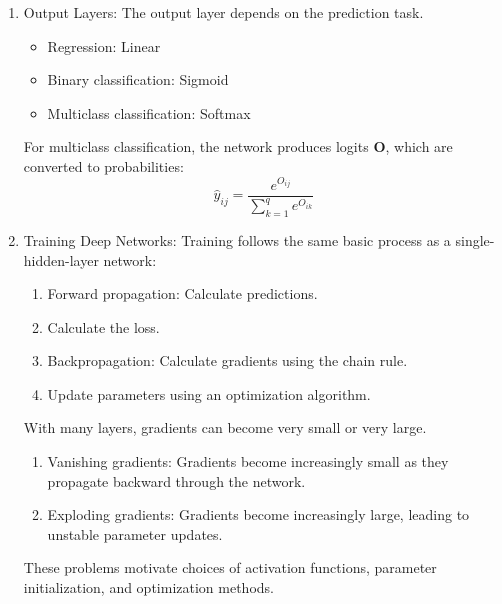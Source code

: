 \documentclass{article}
\begin{document}
\begin{enumerate}
\begin{itemize}
\item Common activation functions:

ReLU
\[
\sigma(x)=\max(0,x)
\]

Sigmoid
\[
\sigma(x)=\frac{1}{1+e^{-x}}
\]

Tanh
\[
\sigma(x)=\frac{e^x-e^{-x}}{e^x+e^{-x}}
\]
ReLU is commonly used in hidden layers. Sigmoid is commonly used for binary classification outputs.

\item For multiple hidden layers:
\[
\begin{aligned}
\mathbf{H}^{(1)} &=
\sigma_1(\mathbf{X}\mathbf{W}^{(1)}
+\mathbf{b}^{(1)})\\
\mathbf{H}^{(2)} &=
\sigma_2(\mathbf{H}^{(1)}\mathbf{W}^{(2)}
+\mathbf{b}^{(2)})
\end{aligned}
\]
Continue stacking layers as needed.
\end{itemize}

\item Output Layers: The output layer depends on the prediction task.
\begin{itemize}
\item Regression:	Linear
\item Binary classification: Sigmoid
\item Multiclass classification:	Softmax
\end{itemize}
For multiclass classification, the network produces logits \(\mathbf{O}\), which are converted to probabilities:
\[
\hat{y}_{ij}=
\frac{e^{O_{ij}}}
{\sum_{k=1}^{q}e^{O_{ik}}}
\]


\item Training Deep Networks: Training follows the same basic process as a single-hidden-layer network:
\begin{enumerate}
\item Forward propagation: Calculate predictions.
\item Calculate the loss.
\item Backpropagation: Calculate gradients using the chain rule.
\item Update parameters using an optimization algorithm.
\end{enumerate}
With many layers, gradients can become very small or very large.
\begin{enumerate}
\item Vanishing gradients: Gradients become increasingly small as they propagate backward through the network.
\item Exploding gradients: Gradients become increasingly large, leading to unstable parameter updates.
\end{enumerate}
These problems motivate choices of activation functions, parameter initialization, and optimization methods.



\end{enumerate}
\end{document}
